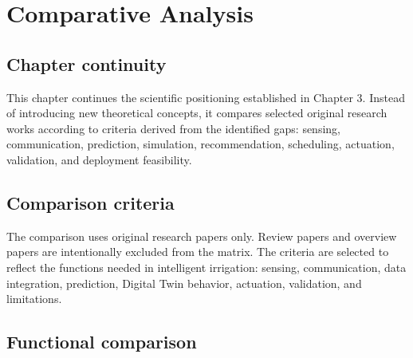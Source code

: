 \chapter{Comparative Analysis}

\section{Chapter continuity}

This chapter continues the scientific positioning established in Chapter 3. Instead of introducing new theoretical concepts, it compares selected original research works according to criteria derived from the identified gaps: sensing, communication, prediction, simulation, recommendation, scheduling, actuation, validation, and deployment feasibility.

\section{Comparison criteria}

The comparison uses original research papers only. Review papers and overview papers are intentionally excluded from the matrix. The criteria are selected to reflect the functions needed in intelligent irrigation: sensing, communication, data integration, prediction, Digital Twin behavior, actuation, validation, and limitations.

\section{Functional comparison}


